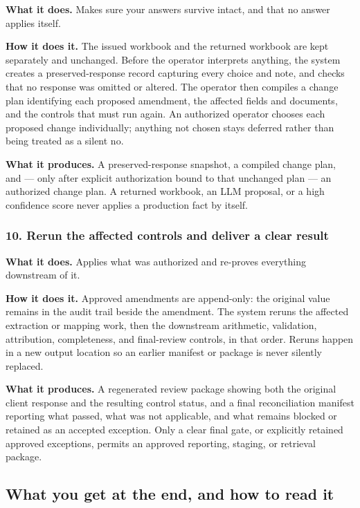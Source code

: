 \documentclass[
]{article}
\begin{document}
\textbf{What it does.} Makes sure your answers survive intact, and that
no answer applies itself.

\textbf{How it does it.} The issued workbook and the returned workbook
are kept separately and unchanged. Before the operator interprets
anything, the system creates a preserved-response record capturing every
choice and note, and checks that no response was omitted or altered. The
operator then compiles a change plan identifying each proposed
amendment, the affected fields and documents, and the controls that must
run again. An authorized operator chooses each proposed change
individually; anything not chosen stays deferred rather than being
treated as a silent no.

\textbf{What it produces.} A preserved-response snapshot, a compiled
change plan, and --- only after explicit authorization bound to that
unchanged plan --- an authorized change plan. A returned workbook, an
LLM proposal, or a high confidence score never applies a production fact
by itself.

\subsubsection{10. Rerun the affected controls and deliver a clear
result}\label{rerun-the-affected-controls-and-deliver-a-clear-result}

\textbf{What it does.} Applies what was authorized and re-proves
everything downstream of it.

\textbf{How it does it.} Approved amendments are append-only: the
original value remains in the audit trail beside the amendment. The
system reruns the affected extraction or mapping work, then the
downstream arithmetic, validation, attribution, completeness, and
final-review controls, in that order. Reruns happen in a new output
location so an earlier manifest or package is never silently replaced.

\textbf{What it produces.} A regenerated review package showing both the
original client response and the resulting control status, and a final
reconciliation manifest reporting what passed, what was not applicable,
and what remains blocked or retained as an accepted exception. Only a
clear final gate, or explicitly retained approved exceptions, permits an
approved reporting, staging, or retrieval package.

\subsection{What you get at the end, and how to read
it}\label{what-you-get-at-the-end-and-how-to-read-it}
\end{document}
